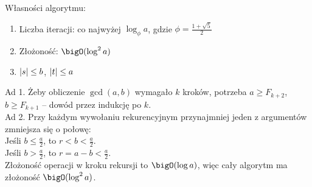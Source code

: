 Własności algorytmu:
\begin{enumerate}
    \item Liczba iteracji: co najwyżej \( \log_{\phi} a \), gdzie \( \phi = \frac{1 + \sqrt{5}}{2} \)
    \item Złożoność: \( \bigO(\log^2 a) \)
    \item \( \left\lvert s\right\rvert \leq b \), \( \left\lvert t\right\rvert \leq a \)
\end{enumerate}
Ad 1. Żeby obliczenie \( \gcd(a, b) \) wymagało \( k \) kroków, potrzeba \( a \geq F_{k+2} \), \( b \geq F_{k+1} \) -- dowód przez indukcję po \( k \). \\
Ad 2. Przy każdym wywołaniu rekurencyjnym przynajmniej jeden z argumentów zmniejsza się o połowę: \\
Jeśli \( b \leq \frac{a}{2} \), to \( r < b < \frac{a}{2} \). \\
Jeśli \( b > \frac{a}{2} \), to \( r = a - b < \frac{a}{2} \). \\
Złożoność operacji w kroku rekursji  to \( \bigO(\log a) \), więc cały algorytm ma złożoność \( \bigO(\log^2 a) \).
